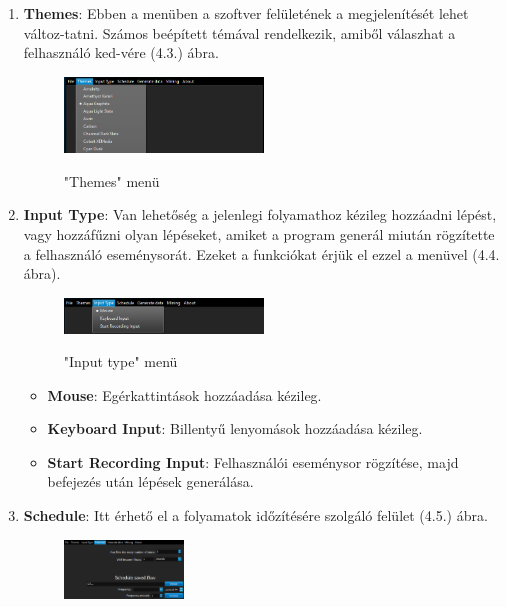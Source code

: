 \begin{enumerate}
{	}
	\item{
		\textbf{Themes}: Ebben a menüben a szoftver felületének a megjelenítését lehet változ\hyp{}tatni. Számos beépített témával rendelkezik, amiből válaszhat a felhasználó ked\hyp{}vére (4.3.) ábra.
		\begin{figure}[h]
			\begin{center}
				\includegraphics[width=0.5\textwidth, keepaspectratio=true]{images/img_ui_themes}\\
				\caption{"Themes" menü}
				\label{fig:example}
			\end{center}
		\end{figure}
	}
	\item{
		\textbf{Input Type}: Van lehetőség a jelenlegi folyamathoz kézileg hozzáadni lépést, vagy hozzáfűzni olyan lépéseket, amiket a program generál miután rögzítette a felhasználó eseménysorát. Ezeket a funkciókat érjük el ezzel a menüvel (4.4. ábra).
		\begin{figure}[h]
			\begin{center}
				\includegraphics[width=0.5\textwidth, keepaspectratio=true]{images/img_ui_input}\\
				\caption{"Input type" menü}
				\label{fig:example}
			\end{center}
		\end{figure}
		\begin{itemize}
			\item{\textbf{Mouse}: Egérkattintások hozzáadása kézileg.}
			\item{\textbf{Keyboard Input}: Billentyű lenyomások hozzáadása kézileg.}
			\item{\textbf{Start Recording Input}: Felhasználói eseménysor rögzítése, majd befejezés után lépések generálása.}
		\end{itemize}
	}
	\item{
		\textbf{Schedule}: Itt érhető el a folyamatok időzítésére szolgáló felület (4.5.) ábra.
		\begin{figure}[h!]
			\begin{center}
				\includegraphics[width=0.3\textwidth, keepaspectratio=true]{images/img_ui_schedule}\\

\end{center}
\end{figure}}
\end{enumerate}
